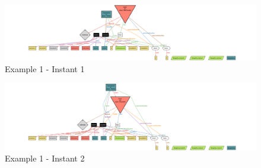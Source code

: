 \begin{figure}[H]
    \centering
    \includegraphics[angle=90,origin=c, height=0.91\textwidth]{alloy/images/example1_1.png}
    \caption{Example 1 - Instant 1}
\end{figure}

\begin{figure}[H]
    \centering
    \includegraphics[angle=90,origin=c, height=0.91\textwidth]{alloy/images/example1_2.png}
    \caption{Example 1 - Instant 2}
\end{figure}

